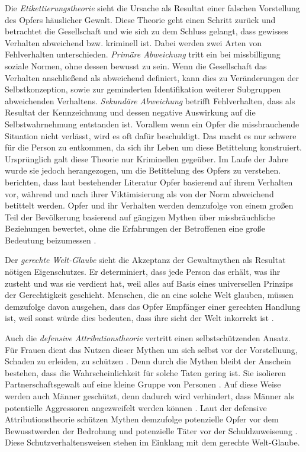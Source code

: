 Die \textit{Etikettierungstheorie} sieht die Ursache als Resultat einer falschen Vorstellung des Opfers häuslicher Gewalt. Diese Theorie geht einen Schritt zurück und betrachtet die Gesellschaft und wie sich zu dem Schluss gelangt, dass gewisses Verhalten abweichend bzw. kriminell ist. Dabei werden zwei Arten von Fehlverhalten unterschieden. \textit{Primäre Abweichung} tritt ein bei missbilligung soziale Normen, ohne dessen bewusst zu sein. Wenn die Gesellschaft das Verhalten anschließend als abweichend definiert, kann dies zu Veränderungen der Selbstkonzeption, sowie zur geminderten Identifikation weiterer Subgruppen abweichenden Verhaltens. \textit{Sekundäre Abweichung} betrifft Fehlverhalten, dass als Resultat der Kennzeichnung und dessen negative Auswirkung auf die Selbstwahrnehmung entstanden ist. Vorallem wenn ein Opfer die missbrauchende Situation nicht verlässt, wird es oft dafür beschuldigt. Das macht es nur schwere für die Person zu entkommen, da sich ihr Leben um diese Betittelung konstruiert. Ursprünglich galt diese Theorie nur Kriminellen gegeüber. Im Laufe der Jahre wurde sie jedoch herangezogen, um die Betittelung des Opfers zu verstehen. \textcite{Labelingtheory_plus} berichten, dass laut bestehender Literatur Opfer basierend auf ihrem Verhalten vor, während und nach ihrer Viktimisierung als von der Norm abweichend betittelt werden. Opfer und ihr Verhalten werden demzufolge von einem großen Teil der Bevölkerung basierend auf gängigen Mythen über missbräuchliche Beziehungen bewertet, ohne die Erfahrungen der Betroffenen eine große Bedeutung beizumessen \parencite{Labelingtheory_plus}.

Der \textit{gerechte Welt-Glaube} sieht die Akzeptanz der Gewaltmythen als Resultat nötigen Eigenschutzes. Er determiniert, dass jede Person das erhält, was ihr zusteht und was sie verdient hat, weil alles auf Basis eines universellen Prinzips der Gerechtigkeit geschieht. Menschen, die an eine solche Welt glauben, müssen demzufolge davon ausgehen, dass das Opfer Empfänger einer gerechten Handlung ist, weil sonst würde dies bedeuten, dass ihre sicht der Welt inkorrekt ist \parencite{GM_Theorien}. 

Auch die \textit{defensive Attributionstheorie} vertritt einen selbstschützenden Ansatz. Für Frauen dient das Nutzen dieser Mythen um sich selbst vor der Vorstelluung, Schaden zu erleiden, zu schützen \parencite{DVMAS, DVMAS_Peters}. Denn durch die Mythen bleibt der Anschein bestehen, dass die Wahrscheinlichkeit für solche Taten gering ist. Sie isolieren Partnerschaftsgewalt auf eine kleine Gruppe von Personen \parencite{DVMAS}. Auf diese Weise werden auch Männer geschützt, denn dadurch wird verhindert, dass Männer als potentielle Aggressoren angezweifelt werden können \parencite{DVMAS, DVMAS_Peters}. Laut der defensive Attributionstheorie schützen Mythen demzufolge potenzielle Opfer vor dem Bewusstwerden der Bedrohung und potenzielle Täter vor der Schuldzuweiseung \parencite{DVMAS_Peters}. Diese Schutzverhaltensweisen stehen im Einklang mit dem gerechte Welt-Glaube.